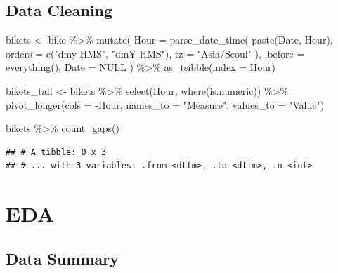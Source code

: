 \documentclass[
]{article}
\newenvironment{Shaded}{\begin{snugshade}}{\end{snugshade}}
\newcommand{\AttributeTok}[1]{\textcolor[rgb]{0.77,0.63,0.00}{#1}}
\newcommand{\ConstantTok}[1]{\textcolor[rgb]{0.00,0.00,0.00}{#1}}
\newcommand{\FunctionTok}[1]{\textcolor[rgb]{0.00,0.00,0.00}{#1}}
\newcommand{\NormalTok}[1]{#1}
\newcommand{\OtherTok}[1]{\textcolor[rgb]{0.56,0.35,0.01}{#1}}
\newcommand{\SpecialCharTok}[1]{\textcolor[rgb]{0.00,0.00,0.00}{#1}}
\newcommand{\StringTok}[1]{\textcolor[rgb]{0.31,0.60,0.02}{#1}}
\begin{document}
\hypertarget{data-cleaning}{%
\subsection{Data Cleaning}\label{data-cleaning}}

\begin{Shaded}
\begin{Highlighting}[]
\NormalTok{bikets }\OtherTok{\textless{}{-}}\NormalTok{ bike }\SpecialCharTok{\%\textgreater{}\%}
  \FunctionTok{mutate}\NormalTok{(}
    \AttributeTok{Hour =} \FunctionTok{parse\_date\_time}\NormalTok{(}
      \FunctionTok{paste}\NormalTok{(Date, Hour),}
      \AttributeTok{orders =} \FunctionTok{c}\NormalTok{(}\StringTok{"dmy HMS"}\NormalTok{, }\StringTok{"dmY HMS"}\NormalTok{),}
      \AttributeTok{tz =} \StringTok{"Asia/Seoul"}
\NormalTok{    ),}
    \AttributeTok{.before =} \FunctionTok{everything}\NormalTok{(),}
    \AttributeTok{Date =} \ConstantTok{NULL}
\NormalTok{  ) }\SpecialCharTok{\%\textgreater{}\%}
  \FunctionTok{as\_tsibble}\NormalTok{(}\AttributeTok{index =}\NormalTok{ Hour)}

\NormalTok{bikets\_tall }\OtherTok{\textless{}{-}}\NormalTok{ bikets }\SpecialCharTok{\%\textgreater{}\%}
  \FunctionTok{select}\NormalTok{(Hour, }\FunctionTok{where}\NormalTok{(is.numeric)) }\SpecialCharTok{\%\textgreater{}\%}
  \FunctionTok{pivot\_longer}\NormalTok{(}\AttributeTok{cols =} \SpecialCharTok{{-}}\NormalTok{Hour,}
               \AttributeTok{names\_to =} \StringTok{"Measure"}\NormalTok{,}
               \AttributeTok{values\_to =} \StringTok{"Value"}\NormalTok{)}
  
\NormalTok{bikets }\SpecialCharTok{\%\textgreater{}\%} \FunctionTok{count\_gaps}\NormalTok{()}
\end{Highlighting}
\end{Shaded}

\begin{verbatim}
## # A tibble: 0 x 3
## # ... with 3 variables: .from <dttm>, .to <dttm>, .n <int>
\end{verbatim}

\hypertarget{eda}{%
\section{EDA}\label{eda}}

\hypertarget{data-summary}{%
\subsection{Data Summary}\label{data-summary}}
\end{document}
